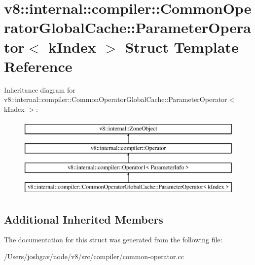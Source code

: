 \hypertarget{structv8_1_1internal_1_1compiler_1_1_common_operator_global_cache_1_1_parameter_operator}{}\section{v8\+:\+:internal\+:\+:compiler\+:\+:Common\+Operator\+Global\+Cache\+:\+:Parameter\+Operator$<$ k\+Index $>$ Struct Template Reference}
\label{structv8_1_1internal_1_1compiler_1_1_common_operator_global_cache_1_1_parameter_operator}
Inheritance diagram for v8\+:\+:internal\+:\+:compiler\+:\+:Common\+Operator\+Global\+Cache\+:\+:Parameter\+Operator$<$ k\+Index $>$\+:\begin{figure}[H]
\begin{center}
\leavevmode
\includegraphics[height=4.000000cm]{structv8_1_1internal_1_1compiler_1_1_common_operator_global_cache_1_1_parameter_operator}
\end{center}
\end{figure}
\subsection*{Additional Inherited Members}


The documentation for this struct was generated from the following file\+:\begin{DoxyCompactItemize}
\item 
/\+Users/joshgav/node/v8/src/compiler/common-\/operator.\+cc\end{DoxyCompactItemize}

